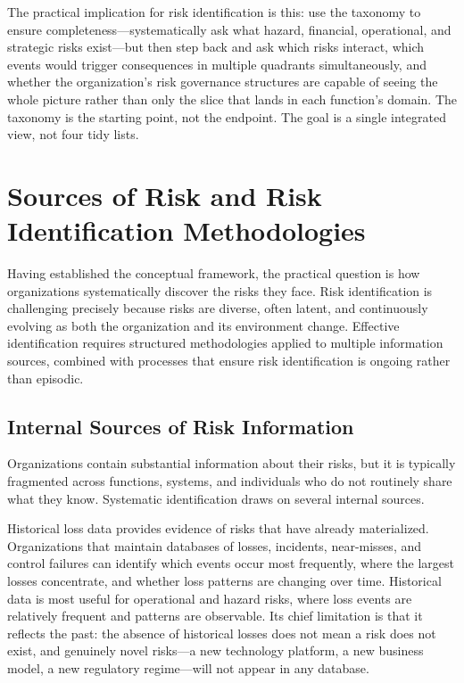 \documentclass[11pt,openany]{book}
\begin{document}
The practical implication for risk identification is this: use the taxonomy to ensure completeness---systematically ask what hazard, financial, operational, and strategic risks exist---but then step back and ask which risks interact, which events would trigger consequences in multiple quadrants simultaneously, and whether the organization's risk governance structures are capable of seeing the whole picture rather than only the slice that lands in each function's domain. The taxonomy is the starting point, not the endpoint. The goal is a single integrated view, not four tidy lists.

\section{Sources of Risk and Risk Identification Methodologies}
\label{sec:sources-and-methods}

Having established the conceptual framework, the practical question is how organizations systematically discover the risks they face. Risk identification is challenging precisely because risks are diverse, often latent, and continuously evolving as both the organization and its environment change. Effective identification requires structured methodologies applied to multiple information sources, combined with processes that ensure risk identification is ongoing rather than episodic.

\subsection{Internal Sources of Risk Information}
\label{subsec:internal-sources}

Organizations contain substantial information about their risks, but it is typically fragmented across functions, systems, and individuals who do not routinely share what they know. Systematic identification draws on several internal sources.

Historical loss data provides evidence of risks that have already materialized. Organizations that maintain databases of losses, incidents, near-misses, and control failures can identify which events occur most frequently, where the largest losses concentrate, and whether loss patterns are changing over time. Historical data is most useful for operational and hazard risks, where loss events are relatively frequent and patterns are observable. Its chief limitation is that it reflects the past: the absence of historical losses does not mean a risk does not exist, and genuinely novel risks---a new technology platform, a new business model, a new regulatory regime---will not appear in any database.
\end{document}

